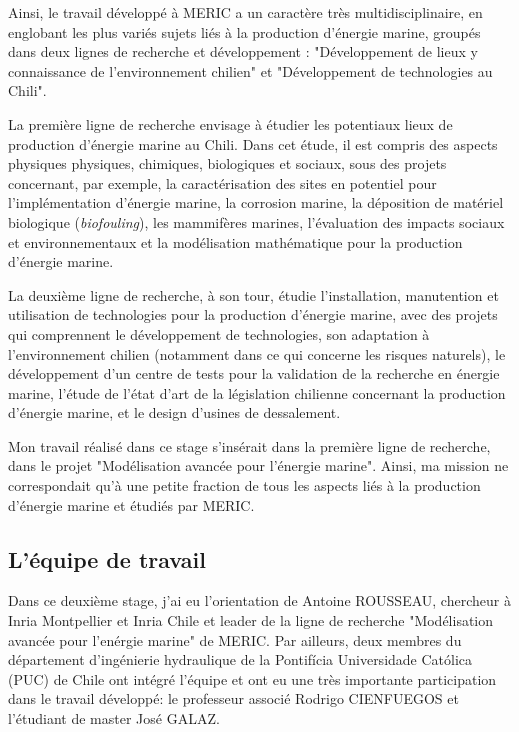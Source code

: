 \indent Ainsi, le travail développé à MERIC a un caractère très multidisciplinaire, en englobant les plus variés sujets liés à la production d'énergie marine, groupés dans deux lignes de recherche et développement : "Développement de lieux y connaissance de l'environnement chilien" et "Développement de technologies au Chili".

\indent La première ligne de recherche envisage à étudier les potentiaux lieux de production d'énergie marine au Chili. Dans cet étude, il est compris des aspects physiques physiques, chimiques, biologiques et sociaux, sous des projets concernant, par exemple, la caractérisation des sites en potentiel pour l'implémentation d'énergie marine, la corrosion marine, la déposition de matériel biologique (\emph{biofouling}), les mammifères marines, l'évaluation des impacts sociaux et environnementaux et la modélisation mathématique pour la production d'énergie marine.

\indent La deuxième ligne de recherche, à son tour, étudie l'installation, manutention et utilisation de technologies pour la production d'énergie marine, avec des projets qui comprennent le développement de technologies, son adaptation à l'environnement chilien (notamment dans ce qui concerne les risques naturels), le développement d'un centre de tests pour la validation de la recherche en énergie marine, l'étude de l'état d'art de la législation chilienne concernant la production d'énergie marine, et le design d'usines de dessalement.

\indent Mon travail réalisé dans ce stage s'insérait dans la première ligne de recherche, dans le projet "Modélisation avancée pour l'énergie marine". Ainsi, ma mission ne correspondait qu'à une petite fraction de tous les aspects liés à la production d'énergie marine et étudiés par MERIC.

\subsection{L'équipe de travail}

\indent Dans ce deuxième stage, j'ai eu l'orientation de Antoine ROUSSEAU, chercheur à Inria Montpellier et Inria Chile et leader de la ligne de recherche "Modélisation avancée pour l'enérgie marine" de MERIC. Par ailleurs, deux membres du département d'ingénierie hydraulique de la Pontifícia  Universidade Católica (PUC) de Chile ont intégré l'équipe et ont eu une très importante participation dans le travail développé: le professeur associé Rodrigo CIENFUEGOS et l'étudiant de master José GALAZ.
